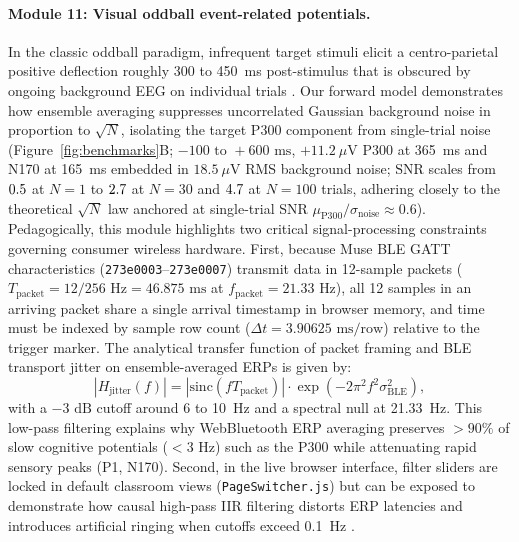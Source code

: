 \documentclass[11pt,letterpaper]{article}
\begin{document}
\paragraph{Module 11: Visual oddball event-related potentials.} In the classic oddball paradigm, infrequent target stimuli elicit a centro-parietal positive deflection roughly 300 to 450~ms post-stimulus that is obscured by ongoing background EEG on individual trials \citep{luck2014introduction,polich2007updating}. Our forward model demonstrates how ensemble averaging suppresses uncorrelated Gaussian background noise in proportion to $\sqrt{N}$, isolating the target P300 component from single-trial noise (Figure~\ref{fig:benchmarks}B; $-100\text{ to }+600\text{ ms}$, $+11.2\ \mu\text{V}$ P300 at 365~ms and N170 at 165~ms embedded in $18.5\ \mu\text{V}$ RMS background noise; $\text{SNR}$ scales from $0.5$ at $N=1$ to $2.7$ at $N=30$ and $4.7$ at $N=100$ trials, adhering closely to the theoretical $\sqrt{N}$ law anchored at single-trial SNR $\mu_{\text{P300}}/\sigma_{\text{noise}} \approx 0.6$). Pedagogically, this module highlights two critical signal-processing constraints governing consumer wireless hardware. First, because Muse BLE GATT characteristics (\texttt{273e0003}--\texttt{273e0007}) transmit data in 12-sample packets ($T_{\text{packet}} = 12/256\text{ Hz} = 46.875\text{ ms}$ at $f_{\text{packet}} = 21.33\text{ Hz}$), all 12 samples in an arriving packet share a single arrival timestamp in browser memory, and time must be indexed by sample row count ($\Delta t = 3.90625\text{ ms/row}$) relative to the trigger marker. The analytical transfer function of packet framing and BLE transport jitter on ensemble-averaged ERPs is given by:
\begin{equation}
|H_{\text{jitter}}(f)| = \left|\text{sinc}(f T_{\text{packet}})\right| \cdot \exp\left(-2\pi^2 f^2 \sigma_{\text{BLE}}^2\right),
\label{eq:jitter}
\end{equation}
with a $-3\text{ dB}$ cutoff around 6 to 10~Hz and a spectral null at 21.33~Hz. This low-pass filtering explains why WebBluetooth ERP averaging preserves $>90\%$ of slow cognitive potentials ($<3\text{ Hz}$) such as the P300 while attenuating rapid sensory peaks (P1, N170). Second, in the live browser interface, filter sliders are locked in default classroom views (\texttt{PageSwitcher.js}) but can be exposed to demonstrate how causal high-pass IIR filtering distorts ERP latencies and introduces artificial ringing when cutoffs exceed 0.1~Hz \citep{tanner2015,luck2014introduction}.
\end{document}
